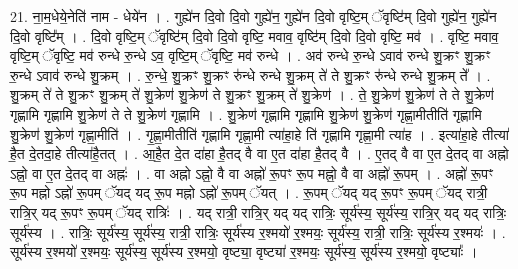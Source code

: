 \documentclass[17pt]{extarticle}
\begin{document}
21. ना॒म॒धेये॒नेति॑ नाम - धेये॑न । . गुह्ये॑न दि॒वो दि॒वो गुह्ये॑न॒ गुह्ये॑न दि॒वो वृष्टि॒म् ॅवृष्टि॑म् दि॒वो गुह्ये॑न॒ गुह्ये॑न दि॒वो वृष्टि᳚म् । . दि॒वो वृष्टि॒म् ॅवृष्टि॑म् दि॒वो दि॒वो वृष्टि॒ मवाव॒ वृष्टि॑म् दि॒वो दि॒वो वृष्टि॒ मव॑ । . वृष्टि॒ मवाव॒ वृष्टि॒म् ॅवृष्टि॒ मव॑ रुन्धे रु॒न्धे ऽव॒ वृष्टि॒म् ॅवृष्टि॒ मव॑ रुन्धे । . अव॑ रुन्धे रु॒न्धे ऽवाव॑ रुन्धे शु॒क्रꣳ शु॒क्रꣳ रु॒न्धे ऽवाव॑ रुन्धे शु॒क्रम् । . रु॒न्धे॒ शु॒क्रꣳ शु॒क्रꣳ रु॑न्धे रुन्धे शु॒क्रम् ते॑ ते शु॒क्रꣳ रु॑न्धे रुन्धे शु॒क्रम् ते᳚ । . शु॒क्रम् ते॑ ते शु॒क्रꣳ शु॒क्रम् ते॑ शु॒क्रेण॑ शु॒क्रेण॑ ते शु॒क्रꣳ शु॒क्रम् ते॑ शु॒क्रेण॑ । . ते॒ शु॒क्रेण॑ शु॒क्रेण॑ ते ते शु॒क्रेण॑ गृह्णामि गृह्णामि शु॒क्रेण॑ ते ते शु॒क्रेण॑ गृह्णामि । . शु॒क्रेण॑ गृह्णामि गृह्णामि शु॒क्रेण॑ शु॒क्रेण॑ गृह्णा॒मीतीति॑ गृह्णामि शु॒क्रेण॑ शु॒क्रेण॑ गृह्णा॒मीति॑ । . गृ॒ह्णा॒मीतीति॑ गृह्णामि गृह्णा॒मी त्या॑हा॒हे ति॑ गृह्णामि गृह्णा॒मी त्या॑ह । . इत्या॑हा॒हे तीत्या॑ है॒त दे॒तदा॒हे तीत्या॑है॒तत् । . आ॒है॒त दे॒त दा॑हा है॒तद् वै वा ए॒त दा॑हा है॒तद् वै । . ए॒तद् वै वा ए॒त दे॒तद् वा अह्नो ऽह्नो॒ वा ए॒त दे॒तद् वा अह्नः॑ । . वा अह्नो ऽह्नो॒ वै वा अह्नो॑ रू॒पꣳ रू॒प मह्नो॒ वै वा अह्नो॑ रू॒पम् । . अह्नो॑ रू॒पꣳ रू॒प मह्नो ऽह्नो॑ रू॒पम् ॅयद् यद् रू॒प मह्नो ऽह्नो॑ रू॒पम् ॅयत् । . रू॒पम् ॅयद् यद् रू॒पꣳ रू॒पम् ॅयद् रात्री॒ रात्रि॒र् यद् रू॒पꣳ रू॒पम् ॅयद् रात्रिः॑ । . यद् रात्री॒ रात्रि॒र् यद् यद् रात्रिः॒ सूर्य॑स्य॒ सूर्य॑स्य॒ रात्रि॒र् यद् यद् रात्रिः॒ सूर्य॑स्य । . रात्रिः॒ सूर्य॑स्य॒ सूर्य॑स्य॒ रात्री॒ रात्रिः॒ सूर्य॑स्य र॒श्मयो॑ र॒श्मयः॒ सूर्य॑स्य॒ रात्री॒ रात्रिः॒ सूर्य॑स्य र॒श्मयः॑ । . सूर्य॑स्य र॒श्मयो॑ र॒श्मयः॒ सूर्य॑स्य॒ सूर्य॑स्य र॒श्मयो॒ वृष्ट्या॒ वृष्ट्या॑ र॒श्मयः॒ सूर्य॑स्य॒ सूर्य॑स्य र॒श्मयो॒ वृष्ट्याः᳚ । \newline
\end{document}
